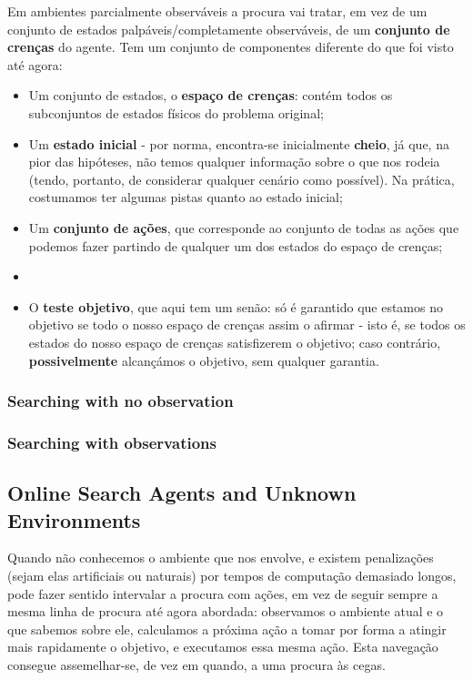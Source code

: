 \documentclass[11pt]{article}
\begin{document}
Em ambientes parcialmente observáveis a procura vai tratar, em vez de um conjunto de estados palpáveis/completamente observáveis, de um \textbf{conjunto de crenças} do agente. Tem um conjunto de componentes diferente do que foi visto até agora:
\begin{itemize}
    \item Um conjunto de estados, o \textbf{espaço de crenças}: contém todos os subconjuntos de estados físicos do problema original;
    \item Um \textbf{estado inicial} - por norma, encontra-se inicialmente \textbf{cheio}, já que, na pior das hipóteses, não temos qualquer informação sobre o que nos rodeia (tendo, portanto, de considerar qualquer cenário como possível). Na prática, costumamos ter algumas pistas quanto ao estado inicial;
    \item Um \textbf{conjunto de ações}, que corresponde ao conjunto de todas as ações que podemos fazer partindo de qualquer um dos estados do espaço de crenças;
    \item %
    \item O \textbf{teste objetivo}, que aqui tem um senão: só é garantido que estamos no objetivo se todo o nosso espaço de crenças assim o afirmar - isto é, se todos os estados do nosso espaço de crenças satisfizerem o objetivo; caso contrário, \textbf{possivelmente} alcançámos o objetivo, sem qualquer garantia.
\end{itemize}

\subsubsection{Searching with no observation}


\subsubsection{Searching with observations}


\subsection{Online Search Agents and Unknown Environments}

Quando não conhecemos o ambiente que nos envolve, e existem penalizações (sejam elas artificiais ou naturais) por tempos de computação demasiado longos, pode fazer sentido intervalar a procura com ações, em vez de seguir sempre a mesma linha de procura até agora abordada: observamos o ambiente atual e o que sabemos sobre ele, calculamos a próxima ação a tomar por forma a atingir mais rapidamente o objetivo, e executamos essa mesma ação. Esta navegação consegue assemelhar-se, de vez em quando, a uma procura às cegas.\vspace{4pt}
\end{document}
